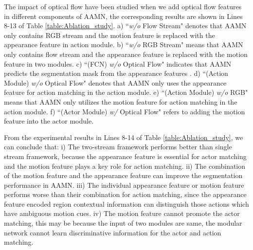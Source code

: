 \documentclass[journal]{IEEEtran}
\begin{document}
The impact of optical flow have been studied when we add optical flow features in different components of AAMN, the corresponding results are shown in Lines 8-13 of Table \ref{table:Ablation_study}. a) ``\emph{w/o} Flow Stream" denotes that AAMN only contains RGB stream and the motion feature  is replaced with the appearance feature  in action module. b) ``\emph{w/o} RGB Stream" means that AAMN only contains flow stream and the appearance feature  is replaced with the motion feature  in two modules. c) ``(FCN) \emph{w/o} Optical Flow" indicates that AAMN predicts the segmentation mask from the appearance features . d) ``(Action Module) \emph{w/o} Optical Flow" denotes that AAMN only uses the appearance feature  for action matching in the action module. e) ``(Action Module) \emph{w/o} RGB" means that AAMN only utilizes the motion feature  for action matching in the action module. f) ``(Actor Module) \emph{w/} Optical Flow" refers to adding the motion feature  into the actor module.

From the experimental results in Lines 8-14 of Table \ref{table:Ablation_study}, we can conclude that: i) The two-stream framework performs better than single stream framework, because the appearance feature  is essential for actor matching and the motion feature  plays a key role for action matching. ii) The combination of the motion feature  and the appearance feature  can improve the segmentation performance in AAMN. iii) The individual appearance feature  or motion feature  performs worse than their combination for action matching, since the appearance feature  encoded region contextual information can distinguish those actions which have ambiguous motion cues. iv) The motion feature  cannot promote the actor matching, this may be because the input of two modules are same, the modular network cannot learn discriminative information for the actor and action matching.
\end{document}
